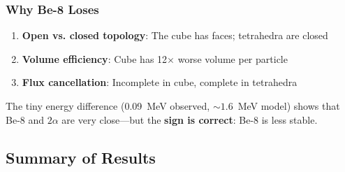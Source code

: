 \subsubsection{Why Be-8 Loses}

\begin{enumerate}
    \item \textbf{Open vs. closed topology}: The cube has faces; tetrahedra are closed
    \item \textbf{Volume efficiency}: Cube has 12$\times$ worse volume per particle
    \item \textbf{Flux cancellation}: Incomplete in cube, complete in tetrahedra
\end{enumerate}

The tiny energy difference (0.09~MeV observed, $\sim 1.6$~MeV model) shows that Be-8 and $2\alpha$ are very close—but the \textbf{sign is correct}: Be-8 is less stable.

\subsection{Summary of Results}
\label{subsec:m6-summary}

